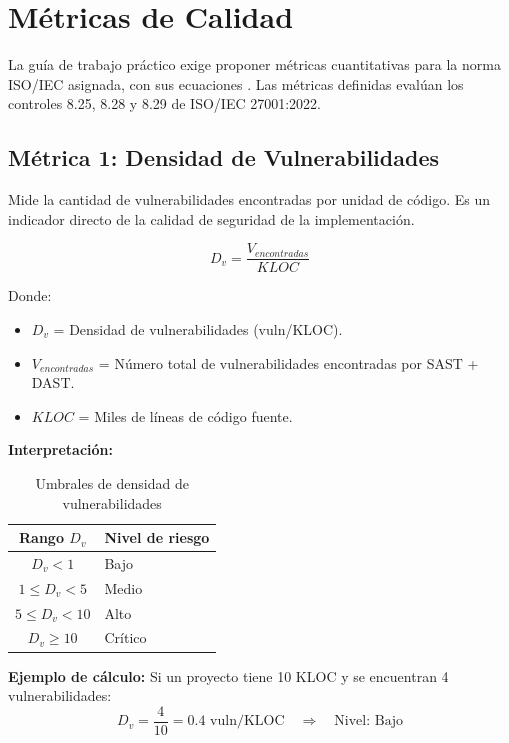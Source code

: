 \section{Métricas de Calidad}
\label{sec:metricas}

La guía de trabajo práctico exige proponer métricas cuantitativas para la norma ISO/IEC asignada, con sus ecuaciones \cite{iso33000-committee}. Las métricas definidas evalúan los controles 8.25, 8.28 y 8.29 de ISO/IEC 27001:2022.

\subsection{Métrica 1: Densidad de Vulnerabilidades}

Mide la cantidad de vulnerabilidades encontradas por unidad de código. Es un indicador directo de la calidad de seguridad de la implementación.

\begin{equation}
D_v = \frac{V_{encontradas}}{KLOC}
\end{equation}

Donde:
\begin{itemize}
    \item $D_v$ = Densidad de vulnerabilidades (vuln/KLOC).
    \item $V_{encontradas}$ = Número total de vulnerabilidades encontradas por SAST + DAST.
    \item $KLOC$ = Miles de líneas de código fuente.
\end{itemize}

\textbf{Interpretación:}
\begin{table}[h]
\centering
\begin{tabular}{|c|l|}
\hline
\textbf{Rango $D_v$} & \textbf{Nivel de riesgo} \\
\hline
$D_v < 1$ & Bajo \\
$1 \leq D_v < 5$ & Medio \\
$5 \leq D_v < 10$ & Alto \\
$D_v \geq 10$ & Crítico \\
\hline
\end{tabular}
\caption{Umbrales de densidad de vulnerabilidades}
\label{tab:umbral-vuln}
\end{table}

\textbf{Ejemplo de cálculo:} Si un proyecto tiene 10 KLOC y se encuentran 4 vulnerabilidades:
\begin{equation}
D_v = \frac{4}{10} = 0.4 \text{ vuln/KLOC} \quad \Rightarrow \quad \text{Nivel: Bajo}
\end{equation}


